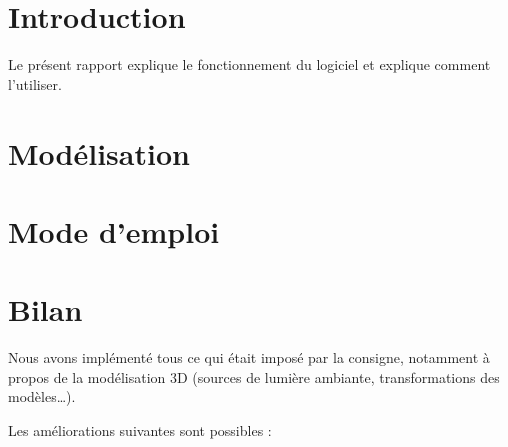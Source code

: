 \documentclass[12pt,a4paper]{article}
\begin{document}


\section*{Introduction}

Le présent rapport explique le fonctionnement du logiciel et explique comment l'utiliser.

\tableofcontents
\newpage


\section{Modélisation}


\section{Mode d'emploi}


\section*{Bilan}

Nous avons implémenté tous ce qui était imposé par la consigne, notamment à propos de la modélisation 3D (sources de lumière ambiante, transformations des modèles\dots).

Les améliorations suivantes sont possibles :
\end{document}
